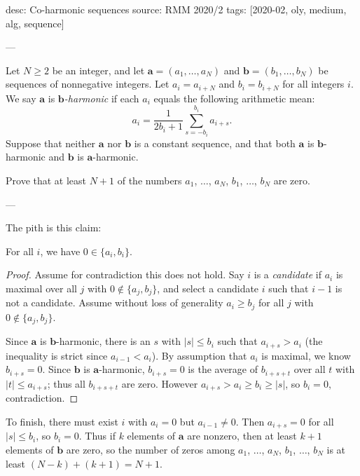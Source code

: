 desc: Co-harmonic sequences
source: RMM 2020/2
tags: [2020-02, oly, medium, alg, sequence]

---

Let $N\ge2$ be an integer, and let $\mathbf a=(a_1,\ldots,a_N)$ and $\mathbf b=(b_1,\ldots,b_N)$ be sequences of nonnegative integers. Let $a_i=a_{i+N}$ and $b_i=b_{i+N}$ for all integers $i$. We say $\mathbf a$ is \emph{$\mathbf b$-harmonic} if each $a_i$ equals the following arithmetic mean: \[a_i=\frac1{2b_i+1}\sum_{s=-b_i}^{b_i}a_{i+s}.\]
Suppose that neither $\mathbf a$ nor $\mathbf b$ is a constant sequence, and that both $\mathbf a$ is $\mathbf b$-harmonic and $\mathbf b$ is $\mathbf a$-harmonic.

Prove that at least $N+1$ of the numbers $a_1$, $\ldots$, $a_N$, $b_1$, $\ldots$, $b_N$ are zero.

---

The pith is this claim:
\begin{claim*}
    For all $i$, we have $0\in\{a_i,b_i\}$.
\end{claim*}
\begin{proof}
    Assume for contradiction this does not hold. Say $i$ is a \emph{candidate} if $a_i$ is maximal over all $j$ with $0\notin\{a_j,b_j\}$, and select a candidate $i$ such that $i-1$ is not a candidate. Assume without loss of generality $a_i\ge b_j$ for all $j$ with $0\notin\{a_j,b_j\}$.

    Since $\mathbf a$ is $\mathbf b$-harmonic, there is an $s$ with $|s|\le b_i$ such that $a_{i+s}>a_i$ (the inequality is strict since $a_{i-1}<a_i$). By assumption that $a_i$ is maximal, we know $b_{i+s}=0$. Since $\mathbf b$ is $\mathbf a$-harmonic, $b_{i+s}=0$ is the average of $b_{i+s+t}$ over all $t$ with $|t|\le a_{i+s}$; thus all $b_{i+s+t}$ are zero. However $a_{i+s}>a_i\ge b_i\ge |s|$, so $b_i=0$, contradiction.
\end{proof}

To finish, there must exist $i$ with $a_i=0$ but $a_{i-1}\ne0$. Then $a_{i+s}=0$ for all $|s|\le b_i$, so $b_i=0$. Thus if $k$ elements of $\mathbf a$ are nonzero, then at least $k+1$ elements of $\mathbf b$ are zero, so the number of zeros among $a_1$, $\ldots$, $a_N$, $b_1$, $\ldots$, $b_N$ is at least $(N-k)+(k+1)=N+1$.

